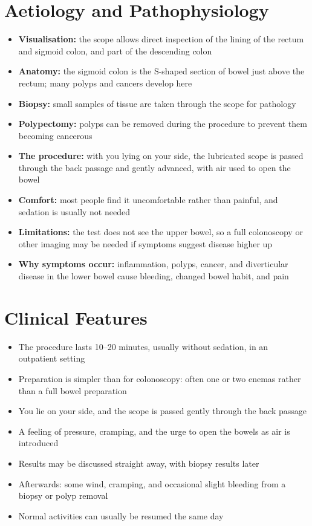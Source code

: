\section*{Aetiology and Pathophysiology}
\begin{itemize}
    \item \textbf{Visualisation:} the scope allows direct inspection of the lining of the rectum and sigmoid colon, and part of the descending colon
    \item \textbf{Anatomy:} the sigmoid colon is the S-shaped section of bowel just above the rectum; many polyps and cancers develop here
    \item \textbf{Biopsy:} small samples of tissue are taken through the scope for pathology
    \item \textbf{Polypectomy:} polyps can be removed during the procedure to prevent them becoming cancerous
    \item \textbf{The procedure:} with you lying on your side, the lubricated scope is passed through the back passage and gently advanced, with air used to open the bowel
    \item \textbf{Comfort:} most people find it uncomfortable rather than painful, and sedation is usually not needed
    \item \textbf{Limitations:} the test does not see the upper bowel, so a full colonoscopy or other imaging may be needed if symptoms suggest disease higher up
    \item \textbf{Why symptoms occur:} inflammation, polyps, cancer, and diverticular disease in the lower bowel cause bleeding, changed bowel habit, and pain
\end{itemize}

\section*{Clinical Features}
\begin{itemize}
    \item The procedure lasts 10--20 minutes, usually without sedation, in an outpatient setting
    \item Preparation is simpler than for colonoscopy: often one or two enemas rather than a full bowel preparation
    \item You lie on your side, and the scope is passed gently through the back passage
    \item A feeling of pressure, cramping, and the urge to open the bowels as air is introduced
    \item Results may be discussed straight away, with biopsy results later
    \item Afterwards: some wind, cramping, and occasional slight bleeding from a biopsy or polyp removal
    \item Normal activities can usually be resumed the same day
\end{itemize}

